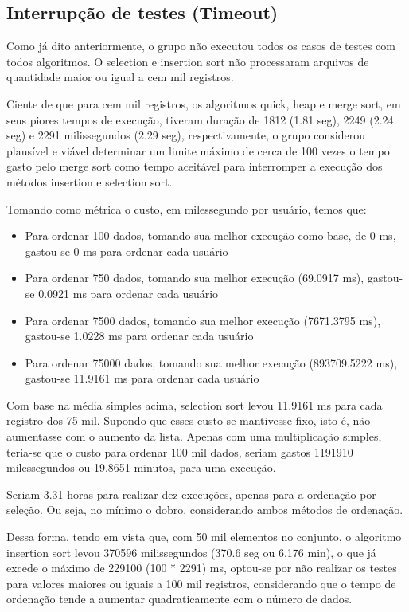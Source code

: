 \documentclass[a4paper,12pt]{scrartcl}
\begin{document}
\subsection{Interrupção de testes (Timeout)}

Como já dito anteriormente, o grupo não executou todos os casos de testes com todos algoritmos. O selection e insertion sort não processaram arquivos de quantidade maior ou igual a cem mil registros.

Ciente de que para cem mil registros, os algoritmos quick, heap e merge sort, em seus piores tempos de execução, tiveram duração de 1812 (1.81 seg), 2249 (2.24 seg) e 2291 milissegundos (2.29 seg), respectivamente, o grupo considerou plausível e viável determinar um limite máximo de cerca de 100 vezes o tempo gasto pelo merge sort como tempo aceitável para interromper a execução dos métodos insertion e selection sort.

Tomando como métrica o custo, em milessegundo por usuário, temos que:
\begin{itemize}
    \item Para ordenar 100 dados, tomando sua melhor execução como base, de 0 ms, gastou-se 0 ms para ordenar cada usuário
    
    \item Para ordenar 750 dados, tomando sua melhor execução (69.0917 ms), gastou-se 0.0921 ms para ordenar cada usuário
    
    \item Para ordenar 7500 dados, tomando sua melhor execução (7671.3795 ms), gastou-se 1.0228 ms para ordenar cada usuário
    
    \item Para ordenar 75000 dados, tomando sua melhor execução (893709.5222 ms), gastou-se 11.9161 ms para ordenar cada usuário
    
\end{itemize}

Com base na média simples acima, selection sort levou 11.9161 ms para cada registro dos 75 mil. Supondo que esses custo se mantivesse fixo, isto é, não aumentasse com o aumento da lista. Apenas com uma multiplicação simples, teria-se que o custo para ordenar 100 mil dados, seriam gastos 1191910 milessegundos ou 19.8651 minutos, para uma execução.

Seriam 3.31 horas para realizar dez execuções, apenas para a ordenação por seleção. Ou seja, no mínimo o dobro, considerando ambos métodos de ordenação.

Dessa forma, tendo em vista que, com 50 mil elementos no conjunto, o algoritmo insertion sort levou 370596 milissegundos (370.6 seg ou 6.176 min), o que já excede o máximo de 229100 (100 * 2291) ms, optou-se por não realizar os testes para valores maiores ou iguais a 100 mil registros, considerando que o tempo de ordenação tende a aumentar quadraticamente com o número de dados.
\end{document}
